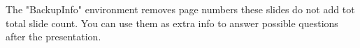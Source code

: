 
\begin{BackupInfo}
	\vspace{5mm}
	The "BackupInfo" environment removes page numbers these slides do not add tot total slide count. You can use them as extra info to answer possible questions after the presentation.
\end{BackupInfo}




